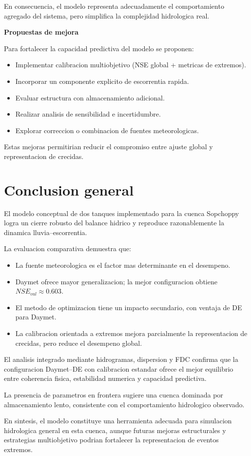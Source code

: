 \documentclass[12pt]{article}
\begin{document}
En consecuencia, el modelo representa adecuadamente el comportamiento agregado del sistema, pero simplifica la complejidad hidrologica real.

{\Large\textbf{Propuestas de mejora}}

Para fortalecer la capacidad predictiva del modelo se proponen:
\begin{itemize}
\item Implementar calibracion multiobjetivo (NSE global + metricas de extremos).
\item Incorporar un componente explicito de escorrentia rapida.
\item Evaluar estructura con almacenamiento adicional.
\item Realizar analisis de sensibilidad e incertidumbre.
\item Explorar correccion o combinacion de fuentes meteorologicas.
\end{itemize}

Estas mejoras permitirian reducir el compromiso entre ajuste global y representacion de crecidas.

\section*{Conclusion general}
El modelo conceptual de dos tanques implementado para la cuenca Sopchoppy logra un cierre robusto del balance hidrico y reproduce razonablemente la dinamica lluvia--escorrentia.

La evaluacion comparativa demuestra que:
\begin{itemize}
\item La fuente meteorologica es el factor mas determinante en el desempeno.
\item Daymet ofrece mayor generalizacion; la mejor configuracion obtiene $NSE_{val} \approx 0.603$.
\item El metodo de optimizacion tiene un impacto secundario, con ventaja de DE para Daymet.
\item La calibracion orientada a extremos mejora parcialmente la representacion de crecidas, pero reduce el desempeno global.
\end{itemize}

El analisis integrado mediante hidrogramas, dispersion y FDC confirma que la configuracion Daymet--DE con calibracion estandar ofrece el mejor equilibrio entre coherencia fisica, estabilidad numerica y capacidad predictiva.

La presencia de parametros en frontera sugiere una cuenca dominada por almacenamiento lento, consistente con el comportamiento hidrologico observado.

En sintesis, el modelo constituye una herramienta adecuada para simulacion hidrologica general en esta cuenca, aunque futuras mejoras estructurales y estrategias multiobjetivo podrian fortalecer la representacion de eventos extremos.
\end{document}
